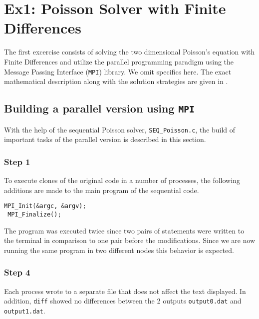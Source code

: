 \section{Ex1: Poisson Solver with Finite Differences}
\label{sec:fdm}
The first excercise consists of solving the two dimensional Poisson's equation with Finite Differences and utilize the parallel programming paradigm using the Message Passing Interface (\texttt{MPI}) library. We omit specifics here. The exact mathematical description along with the solution strategies are given in \cite{labex1}.
\subsection{Building a parallel version using \texttt{MPI}}
With the help of the sequential Poisson solver, \texttt{SEQ\_Poisson.c}, the build of important tasks of the parallel version is described in this section.  
\subsubsection*{Step 1}
To execute clones of the original code in a number of processes, the following additions are made to the main program of the sequential code.\\

\begin{lstlisting}[style=CStyle]
 MPI_Init(&argc, &argv);
 MPI_Finalize();
\end{lstlisting}
The program was executed twice since two pairs of statements were written to the terminal in comparison to one pair before the modifications. Since we are now running the same program in two different nodes this behavior is expected.

\subsubsection*{Step 4}
Each process wrote to a separate file that does not affect the text displayed. In addition, \texttt{diff} showed no differences between the 2 outputs \texttt{output0.dat} and \texttt{output1.dat}.

